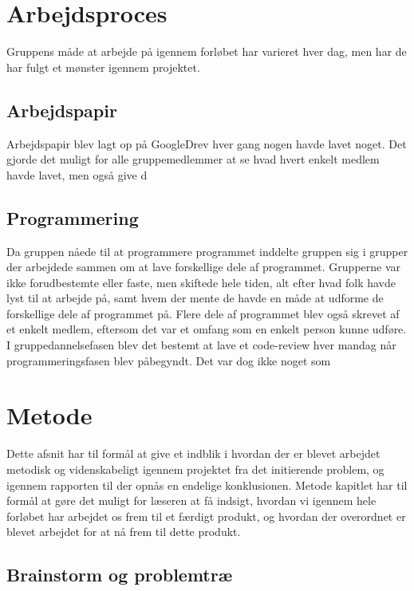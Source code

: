 \chapter{Arbejdsproces}\label{Arbejdsproces}
Gruppens måde at arbejde på igennem forløbet har varieret hver dag, men har de har fulgt et mønster igennem projektet. 


\section{Arbejdspapir}\label{Arbejdspapir}
Arbejdspapir blev lagt op på GoogleDrev hver gang nogen havde lavet noget. Det gjorde det muligt for alle gruppemedlemmer at se hvad hvert enkelt medlem havde lavet, men også give d 

\section{Programmering}\label{Programmering}

Da gruppen nåede til at programmere programmet inddelte gruppen sig i grupper der arbejdede sammen om at lave forskellige dele af programmet. Grupperne var ikke forudbestemte eller faste, men skiftede hele tiden, alt efter hvad folk havde lyst til at arbejde på, samt hvem der mente de havde en måde at udforme de forskellige dele af programmet på. Flere dele af programmet blev også skrevet af et enkelt medlem, eftersom det var et omfang som en enkelt person kunne udføre. I gruppedannelsefasen blev det bestemt at lave et code-review hver mandag når programmeringsfasen blev påbegyndt. Det var dog ikke noget som

\chapter{Metode}\label{Metode}

Dette afsnit har til formål at give et indblik i hvordan der er blevet arbejdet metodisk og videnskabeligt igennem projektet fra det initierende problem, og igennem rapporten til der opnås en endelige konklusionen. Metode kapitlet har til formål at gøre det muligt for læseren at få indsigt, hvordan vi igennem hele forløbet har arbejdet os frem til et færdigt produkt, og hvordan der overordnet er blevet arbejdet for at nå frem til dette produkt.

\section{Brainstorm og problemtræ}

